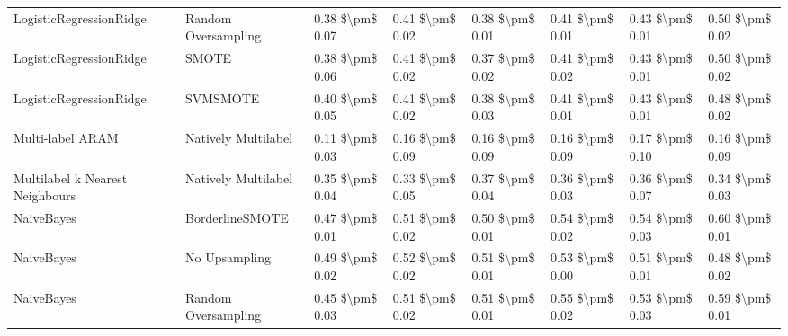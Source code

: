 \begin{tabular}{llllllll}
        LogisticRegressionRidge &           Random Oversampling & 0.38 \$\textbackslash pm\$ 0.07 &           0.41 \$\textbackslash pm\$ 0.02 &       0.38 \$\textbackslash pm\$ 0.01 &        0.41 \$\textbackslash pm\$ 0.01 &                         0.43 \$\textbackslash pm\$ 0.01 &     0.50 \$\textbackslash pm\$ 0.02 \\
        LogisticRegressionRidge &                         SMOTE & 0.38 \$\textbackslash pm\$ 0.06 &           0.41 \$\textbackslash pm\$ 0.02 &       0.37 \$\textbackslash pm\$ 0.02 &        0.41 \$\textbackslash pm\$ 0.02 &                         0.43 \$\textbackslash pm\$ 0.01 &     0.50 \$\textbackslash pm\$ 0.02 \\
        LogisticRegressionRidge &                      SVMSMOTE & 0.40 \$\textbackslash pm\$ 0.05 &           0.41 \$\textbackslash pm\$ 0.02 &       0.38 \$\textbackslash pm\$ 0.03 &        0.41 \$\textbackslash pm\$ 0.01 &                         0.43 \$\textbackslash pm\$ 0.01 &     0.48 \$\textbackslash pm\$ 0.02 \\
               Multi-label ARAM &           Natively Multilabel & 0.11 \$\textbackslash pm\$ 0.03 &           0.16 \$\textbackslash pm\$ 0.09 &       0.16 \$\textbackslash pm\$ 0.09 &        0.16 \$\textbackslash pm\$ 0.09 &                         0.17 \$\textbackslash pm\$ 0.10 &     0.16 \$\textbackslash pm\$ 0.09 \\
Multilabel k Nearest Neighbours &           Natively Multilabel & 0.35 \$\textbackslash pm\$ 0.04 &           0.33 \$\textbackslash pm\$ 0.05 &       0.37 \$\textbackslash pm\$ 0.04 &        0.36 \$\textbackslash pm\$ 0.03 &                         0.36 \$\textbackslash pm\$ 0.07 &     0.34 \$\textbackslash pm\$ 0.03 \\
                     NaiveBayes &               BorderlineSMOTE & 0.47 \$\textbackslash pm\$ 0.01 &           0.51 \$\textbackslash pm\$ 0.02 &       0.50 \$\textbackslash pm\$ 0.01 &        0.54 \$\textbackslash pm\$ 0.02 &                         0.54 \$\textbackslash pm\$ 0.03 &     0.60 \$\textbackslash pm\$ 0.01 \\
                     NaiveBayes &                 No Upsampling & 0.49 \$\textbackslash pm\$ 0.02 &           0.52 \$\textbackslash pm\$ 0.02 &       0.51 \$\textbackslash pm\$ 0.01 &        0.53 \$\textbackslash pm\$ 0.00 &                         0.51 \$\textbackslash pm\$ 0.01 &     0.48 \$\textbackslash pm\$ 0.02 \\
                     NaiveBayes &           Random Oversampling & 0.45 \$\textbackslash pm\$ 0.03 &           0.51 \$\textbackslash pm\$ 0.02 &       0.51 \$\textbackslash pm\$ 0.01 &        0.55 \$\textbackslash pm\$ 0.02 &                         0.53 \$\textbackslash pm\$ 0.03 &     0.59 \$\textbackslash pm\$ 0.01 \\

\end{tabular}
